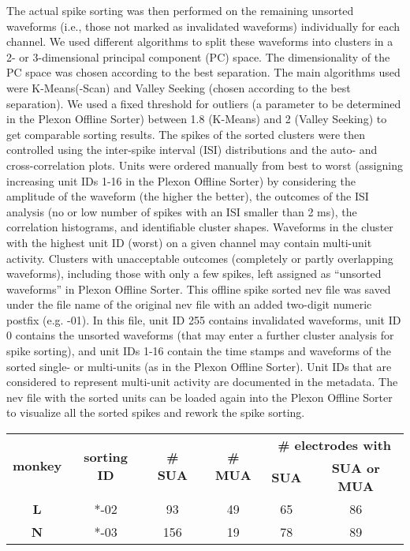 {The actual spike sorting was then performed on the remaining unsorted waveforms (i.e., those not marked as invalidated waveforms) individually for each channel. We used different algorithms to split these waveforms into clusters in a 2- or 3-dimensional principal component (PC) space. The dimensionality of the PC space was chosen according to the best separation. The main algorithms used were K-Means(-Scan) and Valley Seeking (chosen according to the best separation). We used a fixed threshold for outliers (a parameter to be determined in the Plexon Offline Sorter) between 1.8 (K-Means) and 2 (Valley Seeking) to get comparable sorting results. The spikes of the sorted clusters were then controlled using the inter-spike interval (ISI) distributions and the auto- and cross-correlation plots. Units were ordered manually from best to worst (assigning increasing unit IDs 1-16 in the Plexon Offline Sorter) by considering the amplitude of the waveform (the higher the better), the outcomes of the ISI analysis (no or low number of spikes with an ISI smaller than 2 ms), the correlation histograms, and identifiable cluster shapes. Waveforms in the cluster with the highest unit ID (worst) on a given channel may contain multi-unit activity. Clusters with unacceptable outcomes (completely or partly overlapping waveforms), including those with only a few spikes, left assigned as “unsorted waveforms” in Plexon Offline Sorter. This offline spike sorted nev file was saved under the file name of the original nev file with an added two-digit numeric postfix (e.g. -01). In this file, unit ID 255 contains invalidated waveforms, unit ID 0 contains the unsorted waveforms (that may enter a further cluster analysis for spike sorting), and unit IDs 1-16 contain the time stamps and waveforms of the sorted single- or multi-units (as in the Plexon Offline Sorter). Unit IDs that are considered to represent multi-unit activity are documented in the metadata. The nev file with the sorted units can be loaded again into the Plexon Offline Sorter to visualize all the sorted spikes and rework the spike sorting.

\begin{table}
\begin{tabular}{|c|c|c|c|c|c|}
\hline 
\multirow{2}{*}{\textbf{monkey}} & \multirow{2}{*}{\textbf{sorting ID}} & \multirow{2}{*}{\textbf{\# SUA}} & \multirow{2}{*}{\textbf{\# MUA}} & \multicolumn{2}{c|}{\textbf{\# electrodes with}}\tabularnewline
\cline{5-6} 
 &  &  &  & \textbf{SUA} & \textbf{SUA or MUA}\tabularnewline
\hline 
\hline 
\textbf{L} & {*}-02 & 93 & 49 & 65 & 86\tabularnewline
\hline 
\textbf{N} & {*}-03 & 156 & 19 & 78 & 89\tabularnewline
\hline 
\end{tabular}


\end{table}}

